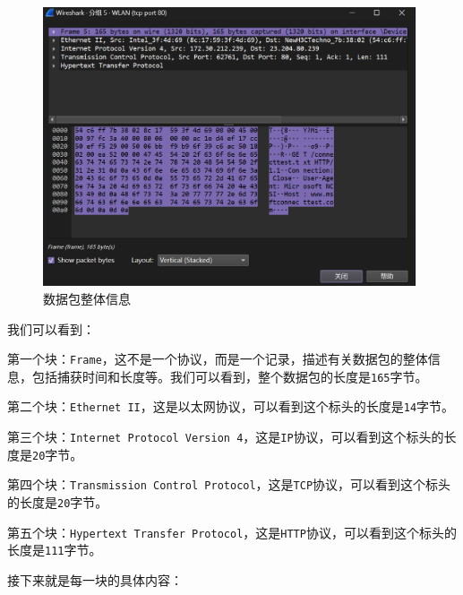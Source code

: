 \documentclass{article}
\begin{document}
	\begin{figure}[H]
		\centering
		\includegraphics[width=11cm]{images/7.数据包整体信息.png}
		\caption{数据包整体信息}
	\end{figure}
	
	我们可以看到：
	
	第一个块：\texttt{Frame}，这不是一个协议，而是一个记录，描述有关数据包的整体信息，包括捕获时间和长度等。我们可以看到，整个数据包的长度是\texttt{165}字节。
	
	第二个块：\texttt{Ethernet II}，这是以太网协议，可以看到这个标头的长度是\texttt{14}字节。
	
	第三个块：\texttt{Internet Protocol Version 4}，这是\texttt{IP}协议，可以看到这个标头的长度是\texttt{20}字节。
	
	第四个块：\texttt{Transmission Control Protocol}，这是\texttt{TCP}协议，可以看到这个标头的长度是\texttt{20}字节。
	
	第五个块：\texttt{Hypertext Transfer Protocol}，这是\texttt{HTTP}协议，可以看到这个标头的长度是\texttt{111}字节。
	
	接下来就是每一块的具体内容：
	
\end{document}
